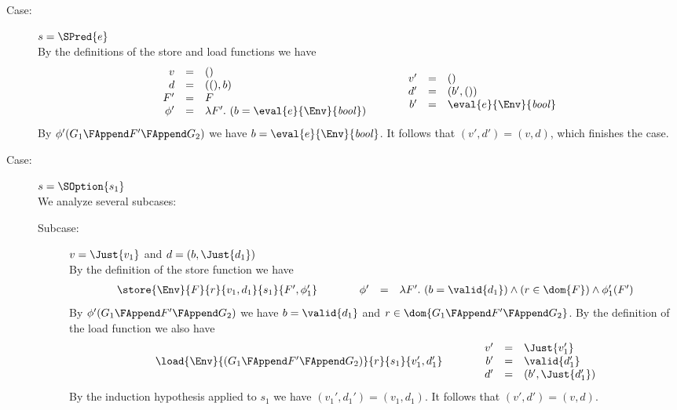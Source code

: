 {\begin{description}
\item[Case:] $s = \SPred{e}$\\[1ex]
%
By the definitions of the store and load functions we have
\[
\begin{array}{rcl}
v &=& ()\\
d &=& ((),b)\\
F' &=& F\\
\phi' &=& \lambda F'.~(b = \eval{e}{\Env}{\mathit{bool}})\\
\end{array}\hspace*{1cm}\begin{array}{rcl}
v' &=& ()\\
d' &=& (b',())\\
b' &=& \eval{e}{\Env}{\mathit{bool}}\\
\end{array}
\]
By $\phi'(G_1 \FAppend F' \FAppend G_2)$ we have $b =
\eval{e}{\Env}{\mathit{bool}}$. It follows that $(v',d') = (v,d)$,
which finishes the case. 

\item[Case:] $s = \SOption{s_1}$\\[1ex]
%
We analyze several subcases:
\begin{description}
\item[Subcase:] $v = \Just{v_1}$ and $d = (b,\Just{d_1})$\\[1ex]
%
By the definition of the store function we have
\[
\begin{array}{l}
\store{\Env}{F}{r}{ v_1,d_1 }{s_1}{F',\phi_1'}\\
\end{array}\hspace*{1cm}\begin{array}{rcl}
\phi' &=& \lambda F'.~(b = \valid{d_1}) \wedge (r \in \dom{F}) \wedge \phi_1'(F')\\
\end{array}
\]
%
By $\phi'(G_1 \FAppend F' \FAppend G_2)$ we have $b = \valid{d_1}$ and
$r \in \dom{G_1 \FAppend F' \FAppend G_2}$.  By the definition of the
load function we also have
\[ 
\begin{array}{rcll}
\load{\Env}{(G_1 \FAppend F' \FAppend G_2)}{r}{s_1}{v_1',d_1'}\\
\end{array}\hspace*{1cm}\begin{array}{rcl}
v' &=& \Just{v_1'}\\
b' &=& \valid{d_1'}\\
d' &=& (b',\Just{d_1'})\\
\end{array}
\]
By the induction hypothesis applied to $s_1$ we have $(v_1',d_1') =
(v_1,d_1)$. It follows that $(v',d') = (v,d)$. 


\end{description}
\end{description}}
